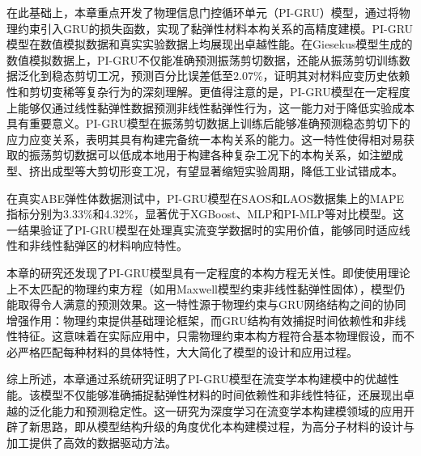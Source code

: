 在此基础上，本章重点开发了物理信息门控循环单元（PI-GRU）模型，通过将物理约束引入GRU的损失函数，实现了黏弹性材料本构关系的高精度建模。PI-GRU模型在数值模拟数据和真实实验数据上均展现出卓越性能。在Giesekus模型生成的数值模拟数据上，PI-GRU不仅能准确预测振荡剪切数据，还能从振荡剪切训练数据泛化到稳态剪切工况，预测百分比误差低至2.07\%，证明其对材料应变历史依赖性和剪切变稀等复杂行为的深刻理解。更值得注意的是，PI-GRU模型在一定程度上能够仅通过线性黏弹性数据预测非线性黏弹性行为，这一能力对于降低实验成本具有重要意义。PI-GRU模型在振荡剪切数据上训练后能够准确预测稳态剪切下的应力应变关系，表明其具有构建完备统一本构关系的能力。这一特性使得相对易获取的振荡剪切数据可以低成本地用于构建各种复杂工况下的本构关系，如注塑成型、挤出成型等大剪切形变工况，有望显著缩短实验周期，降低工业试错成本。

在真实ABE弹性体数据测试中，PI-GRU模型在SAOS和LAOS数据集上的MAPE指标分别为3.33\%和4.32\%，显著优于XGBoost、MLP和PI-MLP等对比模型。这一结果验证了PI-GRU模型在处理真实流变学数据时的实用价值，能够同时适应线性和非线性黏弹区的材料响应特性。

本章的研究还发现了PI-GRU模型具有一定程度的本构方程无关性。即使使用理论上不太匹配的物理约束方程（如用Maxwell模型约束非线性黏弹性固体），模型仍能取得令人满意的预测效果。这一特性源于物理约束与GRU网络结构之间的协同增强作用：物理约束提供基础理论框架，而GRU结构有效捕捉时间依赖性和非线性特征。这意味着在实际应用中，只需物理约束本构方程符合基本物理假设，而不必严格匹配每种材料的具体特性，大大简化了模型的设计和应用过程。


综上所述，本章通过系统研究证明了PI-GRU模型在流变学本构建模中的优越性能。该模型不仅能够准确捕捉黏弹性材料的时间依赖性和非线性特征，还展现出卓越的泛化能力和预测稳定性。这一研究为深度学习在流变学本构建模领域的应用开辟了新思路，即从模型结构升级的角度优化本构建模过程，为高分子材料的设计与加工提供了高效的数据驱动方法。